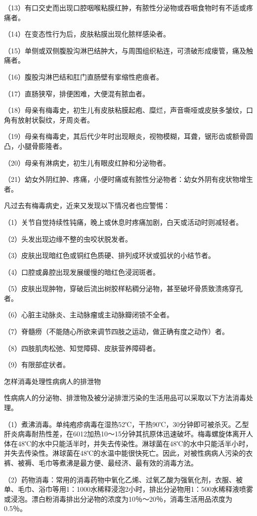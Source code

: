 \documentclass[12pt,UTF8,openany]{ctexbook}
\begin{document}
（13）有口交史而出现口腔咽喉粘膜红肿，有脓性分泌物或吞咽食物时有不适或疼痛者。

（14）在变态性行为后，皮肤粘膜出现化脓样感染者。

（15）单侧或双侧腹股沟淋巴结肿大，与周围组织粘连，可溃破形成瘘管，痛及触痛者。

（16）腹股沟淋巴结和肛门直肠壁有挛缩性疤痕者。

（17）直肠狭窄，排便困难，大便混有脓血者。

（18）母亲有梅毒史，初生儿有皮肤粘膜起疱、糜烂，声音嘶哑或皮肤多皱纹，口角有放射状裂纹，牙周炎者。

（19）母亲有梅毒史，其后代少年时出现眼炎，视物模糊，耳聋，锯形齿或额骨圆凸，小腿骨膨隆者。

（20）母亲有淋病史，初生儿有眼皮红肿和分泌物者。

（21）幼女外阴红肿、疼痛，小便时痛或有脓性分泌物者：幼女外阴有疣状物增生者。

凡过去有梅毒病史，近来又发现以下情况者也应警惕：

（1）关节自觉持续性钝痛，晚上或休息时疼痛加剧，白天或活动时则减轻者。

（2）头发出现边缘不整的虫咬状脱发者。

（3）皮肤出现暗红色或铜红色质硬、排列成环状或弧状的小结节者。

（4）口腔或鼻腔出现发展缓慢的暗红色浸润斑者。

（5）皮肤出现肿物，穿破后流出树胶样粘稠分泌物，甚至破坏骨质致溃疡穿孔者。

（6）心脏主动脉炎、主动脉瘤或主动脉瓣闭锁不全者。

（7）脊髓痨（不能随心所欲来调节四肢之运动，做正确有度之动作）者。

（8）四肢肌肉松弛、知觉障碍、皮肤营养障碍者。

（9）有限部症状者。





怎样消毒处理性病病人的排泄物


性病病人的分泌物、排泄物及被分泌排泄污染的生活用品可以采取以下方法消毒处理。

（1）煮沸消毒。单纯疱疹病毒在湿热52℃，干热90℃，30分钟即可被杀灭。乙型肝炎病毒耐热性差，在6012加热10～15分钟其抗原体迅速破坏。梅毒螺旋体离开人体在48℃的水中只能活半时，并失去传染性。淋球菌在48℃的水中只能活半小时，并失去传染性。淋球菌在48℃的水温中能很快死亡。因此，对被性病病人污染的衣裤、被褥、毛巾等煮沸是最方便、最经济、最有效的消毒方法。

（2）药物消毒：常用的消毒药物中氧化乙烯、过氧乙酸为强氧化剂，衣服、被单、毛巾、浴巾等用1：1000水稀释浸泡2小时，排出分泌物用1：500水稀释液喷雾或浸泡。漂白粉消毒排出分泌物的浓度为10％～20％，消毒生活用品浓度为0.5％。
\end{document}
